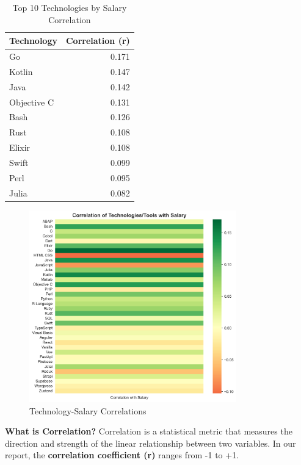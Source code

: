 \documentclass[12pt,a4paper]{article}
\begin{document}
\begin{table}[H]
	\centering
	\small
	\begin{tabular}{lr}
		\toprule
		\textbf{Technology} & \textbf{Correlation (r)} \\
		\midrule
		Go                  & 0.171                    \\
		Kotlin              & 0.147                    \\
		Java                & 0.142                    \\
		Objective C         & 0.131                    \\
		Bash                & 0.126                    \\
		Rust                & 0.108                    \\
		Elixir              & 0.108                    \\
		Swift               & 0.099                    \\
		Perl                & 0.095                    \\
		Julia               & 0.082                    \\
		\bottomrule
	\end{tabular}
	\caption{Top 10 Technologies by Salary Correlation}
\end{table}

\begin{figure}[H]
	\centering
	\includegraphics[width=0.8\textwidth]{figures/heatmap_tech_tool_salary.png}
	\caption{Technology-Salary Correlations}
\end{figure}

\textbf{What is Correlation?}
Correlation is a statistical metric that measures the direction and strength of the linear relationship between two variables. In our report, the \textbf{correlation coefficient (r)} ranges from -1 to +1.
\end{document}
